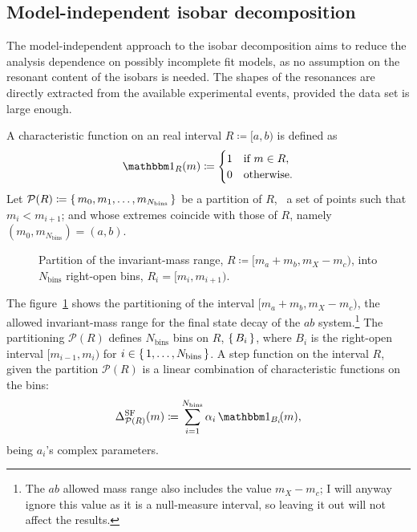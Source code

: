 \subsection{Model-independent isobar decomposition}
\label{sec:model_independent_isobar_decomposition}

    The model-independent approach to the isobar decomposition aims to reduce the analysis dependence on possibly incomplete fit models, as no assumption on the resonant content of the isobars is needed.
    The shapes of the resonances are directly extracted from the available experimental events, provided the data set is large enough.
    

    A characteristic function on an real interval $R \coloneqq [a,b)$ is defined as
    \begin{equation}
        \Characteristic_R(m) \coloneqq 
        \begin{cases}
            1 &\text{if }m \in R, \\
            0 &\text{otherwise}.
        \end{cases}
    \end{equation}
    Let $\mathcal{P}(R) \coloneqq \set{m_0, m_1,\dots, m_{N_\text{bins}}}$ be a partition of $R$, \ie~a set of points such that $m_{i} < m_{i+1}$; and whose extremes coincide with those of $R$, namely $(m_0, m_{N_\text{bins}}) = (a, b)$.
    \begin{figure}
        \centering
        
        \caption{Partition of the invariant-mass range, $R \coloneqq [m_a+m_b,m_X - m_c)$, into $N_\text{bins}$ right-open bins, $R_i = [m_i, m_{i+1})$.}
        \label{fig:invariant-mass-partition}
    \end{figure}
    The figure~\ref{fig:invariant-mass-partition} shows the partitioning of the interval $[m_a+m_b,m_X-m_c)$, the allowed invariant-mass range for the final state decay of the $ab$ system.\footnote{The $ab$ allowed mass range also includes the value $m_X - m_c$; I will anyway ignore this value as it is a null-measure interval, so leaving it out will not affect the results.}
    The partitioning $\mathcal{P}(R)$ defines $N_\text{bins}$ bins on $R$, $\set{B_i}$, where $B_i$ is the right-open interval $[m_{i-1},m_i)$ for $i\in\set{1,\dots, N_\text{bins}}$.
    A step function on the interval $R$, given the partition $\mathcal{P}(R)$ is a linear combination of characteristic functions on the bins:
    \begin{equation}\label{eq:step_dynamic_shape}
        \Delta_{\mathcal{P}(R)}^{\text{SF}}(m) \coloneqq \sum_{i = 1}^{N_\text{bins}} \alpha_i\, \Characteristic_{B_i}\!(m),
    \end{equation}
    being $a_i$'s complex parameters.


